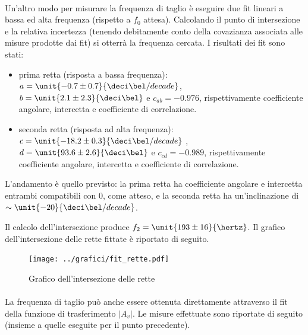 \documentclass[10pt,a4paper]{article}
\begin{document}
\paragraph{} Un'altro modo per misurare la frequenza di taglio è eseguire due fit lineari a bassa ed alta frequenza (rispetto a $f_0$ attesa). Calcolando il punto di intersezione e la relativa incertezza (tenendo debitamente conto della covazianza associata alle misure prodotte dai fit) si otterrà la frequenza cercata. I risultati dei fit sono stati: 
\begin{itemize}
	\item prima retta (risposta a bassa frequenza):	 $a=\unit{-0.7 \pm 0.7}{\deci\bel/decade}$,  $b=\unit{2.1 \pm 2.3}{\deci\bel}$ e $c_{ab} = -0.976$, rispettivamente coefficiente angolare, intercetta e coefficiente di correlazione.
	\item seconda retta (risposta ad alta frequenza):	 $c=\unit{-18.2 \pm 0.3}{\deci\bel/decade}$ , $d=\unit{93.6 \pm 2.6}{\deci\bel}$ e $c_{cd} = -0.989$, rispettivamente coefficiente angolare, intercetta e coefficiente di correlazione.
\end{itemize}
L'andamento è quello previsto: la prima retta ha coefficiente angolare e intercetta entrambi compatibili con $0$, come atteso, e la seconda retta ha un'inclinazione di $\sim \unit{-20}{\deci\bel / decade}$.

Il calcolo dell'intersezione produce $f_2 =\unit{ 193 \pm 16}{\hertz}$.
Il grafico dell'intersezione delle rette fittate è riportato di seguito.
\begin{figure}[h]
	\centering
	\texttt{[image: ../grafici/fit\_rette.pdf]}
	\caption{Grafico dell'intersezione delle rette}
\end{figure}

\paragraph{} La frequenza di taglio può anche essere ottenuta direttamente attraverso il fit della funzione di trasferimento $|A_v|$. Le misure effettuate sono riportate di seguito (insieme a quelle eseguite per il punto precedente).
\end{document}
